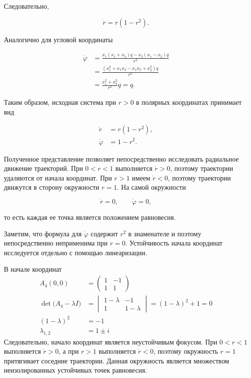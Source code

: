 Следовательно,

\begin{equation}
  \dot r=r(1-r^2).
\end{equation}

Аналогично для угловой координаты

\begin{equation}
  \begin{aligned}
    \dot\varphi
    &=
    \frac{
      x_1(x_1+x_2)q-
      x_2(x_1-x_2)q
    }{r^2}\\
    &=
    \frac{
      \left(
        x_1^2+x_1x_2-x_1x_2+x_2^2
      \right)q
    }{r^2}\\
    &=
    \frac{x_1^2+x_2^2}{r^2}q
    =q.
  \end{aligned}
\end{equation}

Таким образом, исходная система при $r>0$ в полярных координатах
принимает вид

\begin{equation}
  \boxed{
  \begin{aligned}
    \dot r&=r(1-r^2),\\
    \dot\varphi&=1-r^2.
  \end{aligned}}
\end{equation}

Полученное представление позволяет непосредственно исследовать
радиальное движение траекторий. При $0<r<1$ выполняется
$\dot r>0$, поэтому траектории удаляются от начала координат.
При $r>1$ имеем $\dot r<0$, поэтому траектории движутся в сторону
окружности $r=1$. На самой окружности

\[
\dot r=0,\qquad \dot\varphi=0,
\]

то есть каждая ее точка является положением равновесия.

Заметим, что формула для $\dot\varphi$ содержит $r^2$ в знаменателе
и поэтому непосредственно неприменима при $r=0$. Устойчивость
начала координат исследуется отдельно с помощью линеаризации.

В начале координат
\begin{equation}
  \begin{aligned}
    A_4(0,0)&=
    \begin{pmatrix}
      1 & -1\\
      1 & 1
    \end{pmatrix}\\
    \det\bigl(A_4-\lambda I\bigr)
    &=
    \begin{vmatrix}
      1-\lambda & -1\\
      1 & 1-\lambda
    \end{vmatrix}
    =(1-\lambda)^2+1=0\\
    (1-\lambda)^2&=-1\\
    \lambda_{1,2}&=1\pm i
  \end{aligned}
\end{equation}
Следовательно, начало координат является неустойчивым фокусом. При
$0<r<1$ выполняется $\dot r>0$, а при $r>1$ выполняется $\dot r<0$,
поэтому окружность $r=1$ притягивает соседние траектории. Данная окружность является множеством неизолированных устойчивых точек равновесия.


